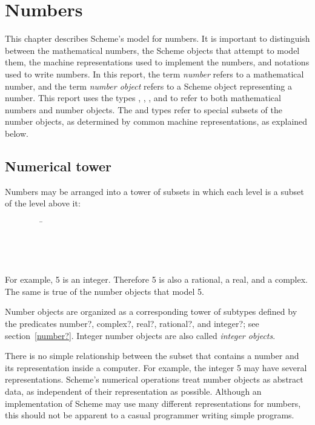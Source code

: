 \chapter{Numbers}
\label{numbertypeschapter}

This chapter describes Scheme's model for numbers.  It is important to
distinguish between the mathematical numbers, the Scheme objects that
attempt to model them, the machine representations used to implement
the numbers, and notations used to write numbers.  In this report, the
term \textit{number} refers to a mathematical number, and the term
\textit{number object} refers to a Scheme object representing a
number.  This report uses the types , ,
, and  to refer to both mathematical
numbers and number objects.  The  and  types
refer to special subsets of the number objects, as determined by
common machine representations, as explained below.

\section{Numerical tower}
\label{numericaltypes}

Numbers may be arranged into a tower of subsets in which each level
is a subset of the level above it:
\begin{tabbing}
\ \ \ \ \ \ \ \ \ \= \\
\>  \\
\>  \\
\>  \\
\>  
\end{tabbing}

For example, 5 is an integer.  Therefore 5 is also a rational,
a real, and a complex.  The same is true of the number objects
that model 5.  

Number objects are organized as a corresponding tower of subtypes
defined by the predicates {\cf number?}, {\cf complex?}, {\cf real?},
{\cf rational?}, and {\cf integer?}; see section~\ref{number?}.
Integer number objects are also called \textit{integer
  objects}.

There is no simple relationship between the subset that contains a
number and its representation inside a computer.  For example, the
integer 5 may have several representations.  Scheme's numerical
operations treat number objects as abstract data, as independent of
their representation as possible.  Although an implementation of
Scheme may use many different representations for numbers, this should
not be apparent to a casual programmer writing simple programs.

